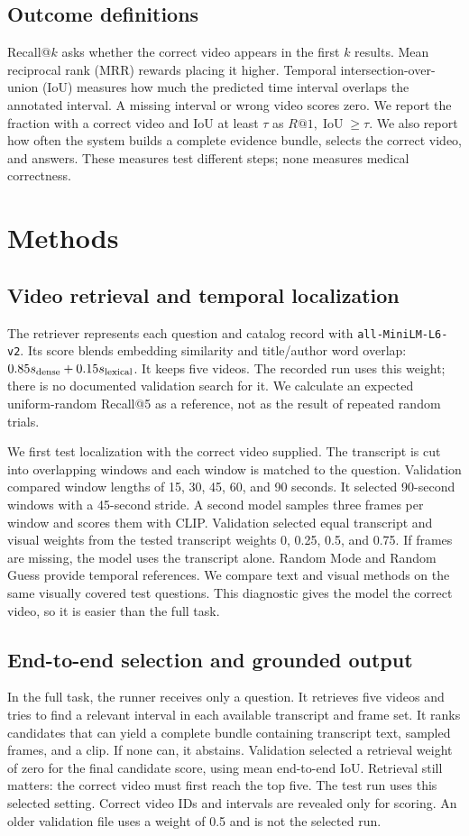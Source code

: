 \documentclass[sigconf,authorversion,nonacm]{acmart}
\begin{document}
\subsection{Outcome definitions}
Recall@\(k\) asks whether the correct video appears in the first \(k\) results. Mean reciprocal rank (MRR) rewards placing it higher. Temporal intersection-over-union (IoU) measures how much the predicted time interval overlaps the annotated interval. A missing interval or wrong video scores zero. We report the fraction with a correct video and IoU at least \(\tau\) as \(R@1,\operatorname{IoU}\geq\tau\). We also report how often the system builds a complete evidence bundle, selects the correct video, and answers. These measures test different steps; none measures medical correctness.

\section{Methods}
\subsection{Video retrieval and temporal localization}
The retriever represents each question and catalog record with \texttt{all-MiniLM-L6-v2}. Its score blends embedding similarity and title/author word overlap: \(0.85s_{\rm dense}+0.15s_{\rm lexical}\). It keeps five videos. The recorded run uses this weight; there is no documented validation search for it. We calculate an expected uniform-random Recall@5 as a reference, not as the result of repeated random trials.

We first test localization with the correct video supplied. The transcript is cut into overlapping windows and each window is matched to the question. Validation compared window lengths of 15, 30, 45, 60, and 90 seconds. It selected 90-second windows with a 45-second stride. A second model samples three frames per window and scores them with CLIP. Validation selected equal transcript and visual weights from the tested transcript weights 0, 0.25, 0.5, and 0.75. If frames are missing, the model uses the transcript alone. Random Mode and Random Guess provide temporal references. We compare text and visual methods on the same visually covered test questions. This diagnostic gives the model the correct video, so it is easier than the full task.

\subsection{End-to-end selection and grounded output}
In the full task, the runner receives only a question. It retrieves five videos and tries to find a relevant interval in each available transcript and frame set. It ranks candidates that can yield a complete bundle containing transcript text, sampled frames, and a clip. If none can, it abstains. Validation selected a retrieval weight of zero for the final candidate score, using mean end-to-end IoU. Retrieval still matters: the correct video must first reach the top five. The test run uses this selected setting. Correct video IDs and intervals are revealed only for scoring. An older validation file uses a weight of 0.5 and is not the selected run.
\end{document}

